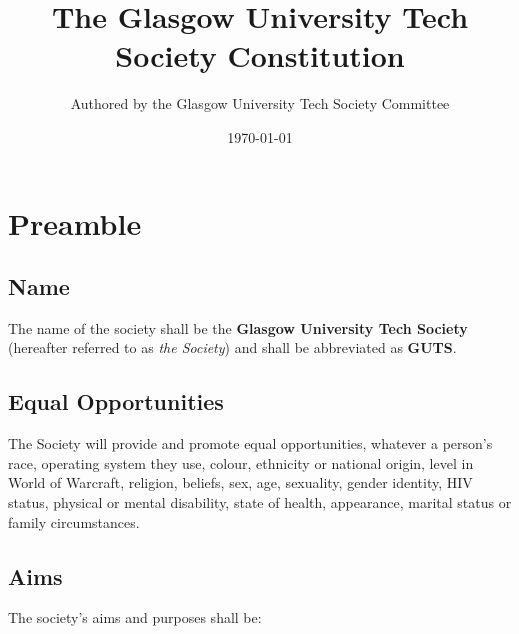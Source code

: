 \documentclass{report}
\newcommand{\society}{Glasgow University Tech Society}
\newcommand{\shortsociety}{GUTS}
\begin{document}
\title{The \society{} Constitution}
\author{Authored by the \society{} Committee}
\date{\today}
\maketitle{}

\tableofcontents
\newpage

\chapter{Preamble}

	\section{Name}

		The name of the society shall be the \textbf{\society{}} (hereafter referred to as \textit{the Society}) and shall be abbreviated as \textbf{\shortsociety{}}.

	\section{Equal Opportunities}

		The Society will provide and promote equal opportunities, whatever a person’s race, operating system they use, colour, ethnicity or national origin, level in World of Warcraft, religion, beliefs, sex, age, sexuality, gender identity, HIV status, physical or mental disability, state of health, appearance, marital status or family circumstances. 

	\section{Aims}

		The society's aims and purposes shall be:
\end{document}
